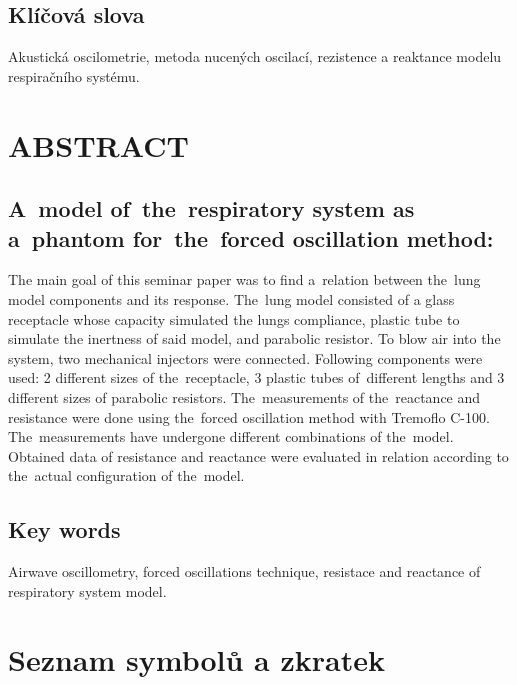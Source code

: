 \documentclass[a4paper,12pt]{article}   %
\numberwithin{equation}{section}        %
\newcommand{\nazevENG}{A~model of~the~respiratory system as a~phantom for~the~forced oscillation method}
\begin{document}
	\subsection*{Klíčová slova}
		Akustická oscilometrie, metoda nucených oscilací, rezistence a reaktance modelu respiračního systému.
	\clearpage
		
		
	\null\vfill	
	\section*{ABSTRACT}
        \subsection*{\nazevENG:}
		 
        The main goal of this seminar paper was to find a~relation between the~lung model components and its response. The~lung model consisted of a glass receptacle whose capacity simulated the lungs compliance, plastic tube to simulate the inertness of said model, and parabolic resistor. To blow air into the system, two mechanical injectors were connected. Following components were used: 2 different sizes of the~receptacle, 3 plastic tubes of~different lengths and 3 different sizes of parabolic resistors. The~measurements of the~reactance and resistance were done using the~forced oscillation method with Tremoflo C-100. The~measurements have undergone different combinations of the~model. Obtained data of resistance and reactance were evaluated in relation according to the~actual configuration of the~model.
    
	\subsection*{Key words}
		Airwave oscillometry, forced oscillations technique, resistace and reactance of respiratory system model.
	\clearpage
	
    \pagestyle{plain}	%
	
	\tableofcontents			%
\clearpage

%

	\section*{Seznam symbolů a zkratek} %
	
	\clearpage
		
\end{document}
